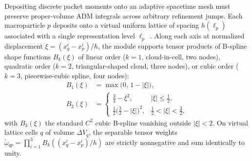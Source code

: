 Depositing discrete packet moments onto an adaptive spacetime mesh must preserve proper-volume ADM integrals across arbitrary refinement jumps. Each macroparticle $p$ deposits onto a virtual uniform lattice of spacing $h(\ell_p)$ associated with a single representation level $\ell_p$~\cite{Myers:2021gfn,Wu:2026nrpic}. Along each axis at normalized displacement $\xi = (x_q^i - x_p^i)/h$, the module supports tensor products of B-spline shape functions $B_k(\xi)$ of linear order ($k=1$, cloud-in-cell, two nodes), quadratic order ($k=2$, triangular-shaped cloud, three nodes), or cubic order ($k=3$, piecewise-cubic spline, four nodes):
\begin{align}\label{eq:bspline_shapes}
B_1(\xi) &= \max\bigl(0,\, 1 - |\xi|\bigr), \nonumber\\
B_2(\xi) &= \begin{cases}
\frac{3}{4} - \xi^2, & |\xi| \le \frac{1}{2}, \\[3pt]
\frac{1}{2}\bigl(\frac{3}{2} - |\xi|\bigr)^2, & \frac{1}{2} < |\xi| < \frac{3}{2},
\end{cases}
\end{align}
with $B_3(\xi)$ the standard $C^2$ cubic B-spline vanishing outside $|\xi| < 2$. On virtual lattice cells $q$ of volume $\Delta V_q$, the separable tensor weights $\tilde{\omega}_{qp} = \prod_{i=1}^3 B_k((x_q^i - x_p^i)/h)$ are strictly nonnegative and sum identically to unity.


